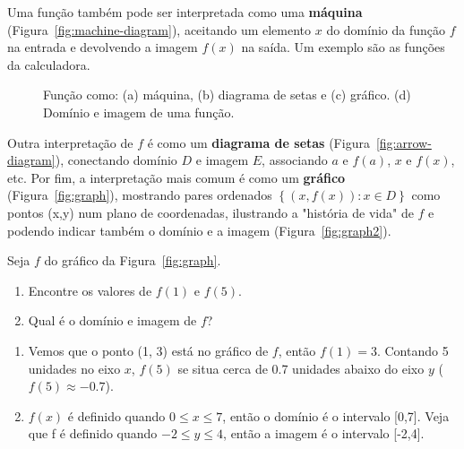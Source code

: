 Uma função também pode ser interpretada como uma \textbf{máquina} (Figura~\ref{fig:machine-diagram}), aceitando um elemento $x$ do domínio da função $f$ na entrada e devolvendo a imagem $f(x)$ na saída. Um exemplo são as funções da calculadora.
\begin{figure}[!ht]
  \centering
  \vspace{0.0cm}
  \begin{minipage}[b]{0.3\columnwidth}
    \centering
    \vfill
  \end{minipage}
  \usebox{\measurebox}\qquad
  \caption{Função como: (a) máquina, (b) diagrama de setas e (c) gráfico. (d) Domínio e imagem de uma função.}
\end{figure}

Outra interpretação de $f$ é como um \textbf{diagrama de setas} (Figura~\ref{fig:arrow-diagram}), conectando domínio $D$ e imagem $E$, associando $a$ e $f(a)$, $x$ e $f(x)$, etc. Por fim, a interpretação mais comum é como um \textbf{gráfico} (Figura~\ref{fig:graph}), mostrando pares ordenados $\left\{(x,f(x)):x\in D\right\}$ como pontos (x,y) num plano de coordenadas, ilustrando a "história de vida" de $f$ e podendo indicar também o domínio e a imagem (Figura~\ref{fig:graph2}).

 Seja $f$ do gráfico da Figura~\ref{fig:graph}.
\begin{enumerate}[label=(\alph*)]
  \item Encontre os valores de $f(1)$ e $f(5)$.
  \item Qual é o domínio e imagem de $f$?
\end{enumerate}
\solution
\begin{enumerate}[label=(\alph*)]
  \item Vemos que o ponto (1, 3) está no gráfico de $f$, então $f(1) = 3$. Contando 5 unidades no eixo $x$, $f(5)$ se situa cerca de 0.7 unidades abaixo do eixo $y$ ($f(5)\approx-0.7$).
  \item $f(x)$ é definido quando $0\leq x \leq 7$, então o domínio é o intervalo [0,7]. Veja que f é definido quando $-2\leq y \leq 4$, então a imagem é o intervalo [-2,4].
\end{enumerate}

